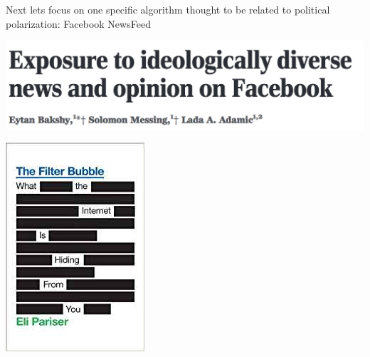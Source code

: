 \documentclass[aspectratio=169]{beamer}
\begin{document}
\begin{frame}

Next lets focus on one specific algorithm thought to be related to political polarization: Facebook NewsFeed

\end{frame}
\begin{frame}

\begin{center}
\includegraphics[width=\textwidth]{figures/bakshy_exposure_2015_title}
\end{center}

\end{frame}
\begin{frame}

\begin{center}
\includegraphics[height=0.95\textheight]{figures/pariser_filter_2011_cover}
\end{center}

\end{frame}
\end{document}
